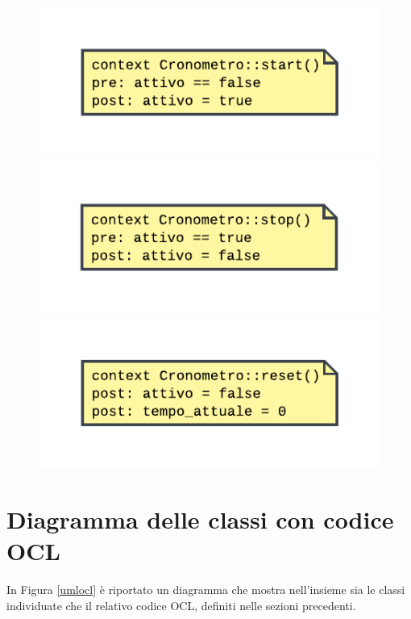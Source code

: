 \documentclass[11pt, a4paper]{article}
\theoremstyle{definition} %
\begin{document}
\begin{itemize}
    \begin{figure}[H]
    \includegraphics[scale = 0.8]{materiale/ocl-start.pdf}
    \includegraphics[scale = 0.8]{materiale/ocl-stop.pdf}
    \centering
    \includegraphics[scale = 0.8]{materiale/ocl-reset.pdf}
    \end{figure}
\end{itemize}











\newpage
\section{Diagramma delle classi con codice OCL}
In Figura \ref{umlocl} è riportato un diagramma che mostra nell'insieme
sia le classi individuate che il relativo codice OCL, definiti nelle
sezioni precedenti.
\end{document}
